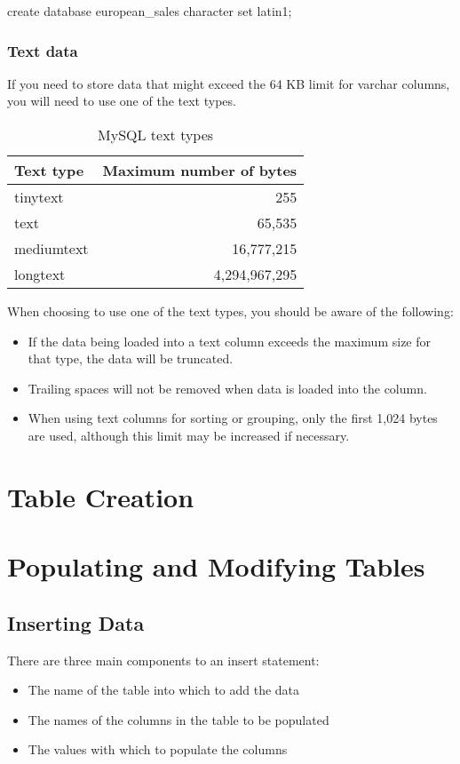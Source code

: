 \textsf{create database european\_sales character set latin1;}

\subsubsection*{Text data}
If you need to store data that might exceed the 64 KB limit for varchar columns, you will need to use one of the text types.
\begin{table}
    \centering
    \caption{MySQL text types}
    \label{tbl2-1}
    \begin{tabular}{lr}
        \hline
        Text type  & Maximum number of bytes \\
        \hline
        tinytext   & 255                     \\
        text       & 65,535                  \\
        mediumtext & 16,777,215              \\
        longtext   & 4,294,967,295           \\
        \hline
    \end{tabular}
\end{table}

When choosing to use one of the text types, you should be aware of the following:
\begin{itemize}
    \item If the data being loaded into a text column exceeds the maximum size for that type, the data will be truncated.
    \item Trailing spaces will not be removed when data is loaded into the column.
    \item When using text columns for sorting or grouping, only the first 1,024 bytes are used, although this limit may be increased if necessary.
\end{itemize}

\section{Table Creation}
\section{Populating and Modifying Tables}
\subsection{Inserting Data}
There are three main components to an insert statement:
\begin{itemize}
    \item The name of the table into which to add the data
    \item The names of the columns in the table to be populated
    \item The values with which to populate the columns
\end{itemize}
